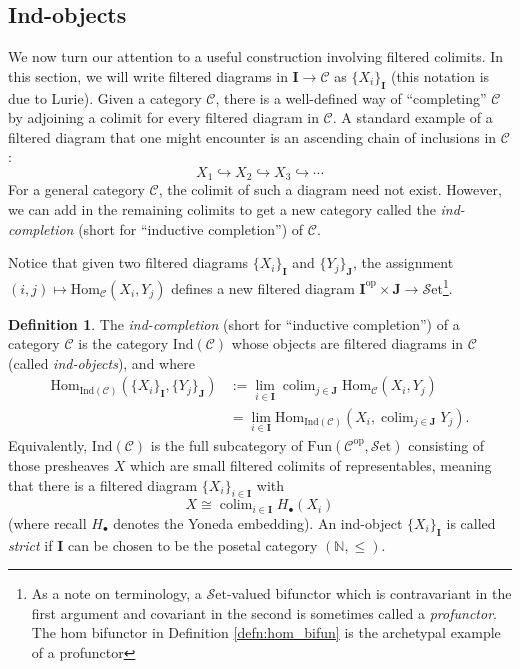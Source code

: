 \documentclass[10pt,oneside]{book}
\def\~#1{\mathscr{#1}}
\newcommand{\N}{\mathbb{N}}
\newcommand{\op}{\mathrm{op}}
\newcommand{\colim}{\mathop{\mathrm{colim}}}
\newcommand{\Hom}{\mathrm{Hom}}
\newcommand{\mono}{\hookrightarrow}
\newcommand{\Ind}{\mathrm{Ind}}
\newcommand{\Fun}{\mathrm{Fun}}
\newcommand{\Set}{\~S\mathrm{et}}
\theoremstyle{plain}
\theoremstyle{definition}
\newtheorem{defn}[thm]{Definition}
\theoremstyle{remark}
\numberwithin{equation}{section}
\numberwithin{figure}{section}
\begin{document}
\subsection*{Ind-objects}
We now turn our attention to a useful construction involving filtered colimits. In this section, we will write filtered diagrams in $\mathbf{I} \to \~C$ as $\{X_i\}_{\mathbf{I}}$ (this notation is due to Lurie).  Given a category $\~C$, there is a well-defined way of ``completing'' $\~C$ by adjoining a colimit for every filtered diagram in $\~C$. A standard example of a filtered diagram that one might encounter is an ascending chain of inclusions in $\~C$:
\[X_1 \mono X_2 \mono X_3 \mono \cdots\]
For a general category $\~C$, the colimit of such a diagram need not exist. However, we can add in the remaining colimits to get a new category called the \emph{ind-completion} (short for ``inductive completion'') of $\~C$.

Notice that given two filtered diagrams $\{X_i\}_{\mathbf{I}}$ and $\{Y_j\}_{\mathbf{J}}$, the assignment $(i,j) \mapsto \Hom_\~C(X_i, Y_j)$ defines a new filtered diagram $\mathbf{I}^\op \times \mathbf{J} \to \Set$\footnote{As a note on terminology, a $\Set$-valued bifunctor which is contravariant in the first argument and covariant in the second is sometimes called a \emph{profunctor}. The hom bifunctor in Definition \ref{defn:hom_bifun} is the archetypal example of a profunctor}.

\begin{defn}
    The \emph{ind-completion} (short for ``inductive completion'') of a category $\~C$ is the category $\Ind(\~C)$ whose objects are filtered diagrams in $\~C$ (called \emph{ind-objects}), and where
    \begin{align}\Hom_{\Ind(\~C)}\left(\{X_i\}_\mathbf{I}, \{Y_j\}_\mathbf{J}\right) &:= \lim_{i \in \mathbf{I}}\colim_{j \in \mathbf{J}} \Hom_\~C(X_i, Y_j) \\ 
    &=\lim_{i \in \mathbf{I}}\Hom_{\Ind(\~C)}\left(X_i, \colim_{j \in \mathbf{J}} Y_j\right).
    \end{align}
    Equivalently, $\Ind(\~C)$ is the full subcategory of $\Fun\left(\~C^\op, \Set\right)$ consisting of those presheaves $X$ which are small filtered colimits of representables, meaning that there is a filtered diagram $\{X_i\}_{i \in \mathbf{I}}$ with
    \[X \cong \colim_{i \in \mathbf{I}}H_\bullet(X_i)\]
    (where recall $H_\bullet$ denotes the Yoneda embedding). An ind-object $\{X_i\}_{\mathbf{I}}$ is called \emph{strict} if $\mathbf{I}$ can be chosen to be the posetal category $(\N, \le)$. 
\end{defn}
\end{document}
